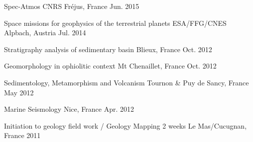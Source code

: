 

\begin{cvhonors}

  \cvhonor
  	{Spec-Atmos}
  	{CNRS}
  	{Fréjus, France}
  	{Jun. 2015}

  \cvhonor
    {Space missions for geophysics of the terrestrial planets}
    {ESA/FFG/CNES}
    {Alpbach, Austria}
    {Jul. 2014}

\end{cvhonors}


\begin{cvhonors}

  \cvhonor
    {Stratigraphy analysis of sedimentary basin}
    {}
    {Blieux, France}
    {Oct. 2012}

  \cvhonor
    {Geomorphology in ophiolitic context}
    {}
    {Mt Chenaillet, France}
    {Oct. 2012}

  \cvhonor
    {Sedimentology, Metamorphism and Volcanism}
    {}
    {Tournon \& Puy de Sancy, France}
    {May 2012}

  \cvhonor
    {Marine Seismology}
    {}
    {Nice, France}
    {Apr. 2012}

  \cvhonor
    {Initiation to geology field work / Geology Mapping}
    {2 weeks}
    {Le Mas/Cucugnan, France}
    {2011}

\end{cvhonors}

